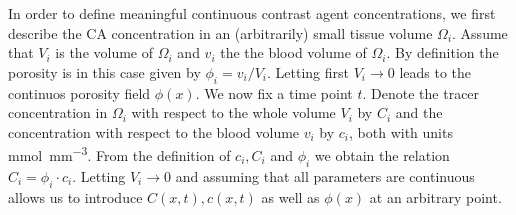 \documentclass[paper=a4, fontsize=12pt,parskip=half,headings=small]{scrartcl}
\newcommand{\sic}{\milli\mol\per\cubic\milli\meter}
\begin{document}
	In order to define meaningful continuous contrast agent concentrations, we first describe the CA concentration in an (arbitrarily) small tissue volume $\Omega_i$.
	Assume that $V_i$ is the volume of $\Omega_i$ and $v_i$ the the blood volume of $\Omega_i$.
	By definition the porosity is in this case given by $\phi_i = v_i/V_i$.
	Letting first $V_i \rightarrow 0$ leads to the continuos porosity field $\phi(x)$.	
	We now fix a time point $t$.
	Denote the tracer concentration in $\Omega_i$ with respect to the whole volume $V_i$ by $C_i$ and the concentration with respect to the blood volume $v_i$ by $c_i$, both with units \si{\sic}. 
	From the definition of $c_i,C_i$ and $\phi_i$ we obtain the relation $C_i = \phi_i \cdot c_i$.
	Letting $V_i \to 0$ and assuming that all parameters are continuous allows us to introduce $C(x,t),c(x,t)$ as well as $\phi(x)$ at an arbitrary point.
\end{document}
